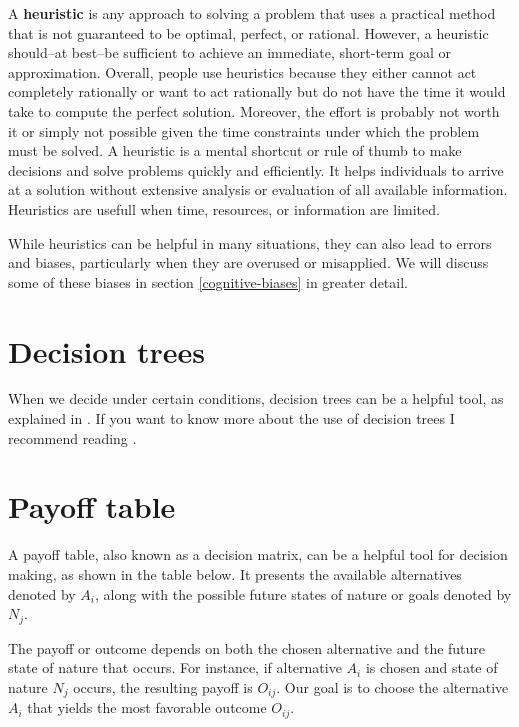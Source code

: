 \documentclass[
  12pt,
  oneside]{book}
\theoremstyle{definition}
\theoremstyle{definition}
\theoremstyle{definition}
\theoremstyle{definition}
\theoremstyle{remark}
\begin{document}
A \textbf{heuristic} is any approach to solving a problem that uses a practical method that is not guaranteed to be optimal, perfect, or rational. However, a heuristic should--at best--be sufficient to achieve an immediate, short-term goal or approximation. Overall, people use heuristics because they either cannot act completely rationally or want to act rationally but do not have the time it would take to compute the perfect solution. Moreover, the effort is probably not worth it or simply not possible given the time constraints under which the problem must be solved.
A heuristic is a mental shortcut or rule of thumb to make decisions and solve problems quickly and efficiently. It helps individuals to arrive at a solution without extensive analysis or evaluation of all available information. Heuristics are usefull when time, resources, or information are limited.

While heuristics can be helpful in many situations, they can also lead to errors and biases, particularly when they are overused or misapplied. We will discuss some of these biases in section \ref{cognitive-biases} in greater detail.

\section{Decision trees}\label{decision-trees}

When we decide under certain conditions, decision trees can be a helpful tool, as explained in \citep{Finne1998three}. If you want to know more about the use of decision trees I recommend reading \citet[ch.~4]{Bonanno2017Decision}.

\section{Payoff table}\label{payoff-table}

A payoff table, also known as a decision matrix, can be a helpful tool for decision making, as shown in the table below. It presents the available alternatives denoted by \(A_i\), along with the possible future states of nature or goals denoted by \(N_j\).

The payoff or outcome depends on both the chosen alternative and the future state of nature that occurs. For instance, if alternative \(A_i\) is chosen and state of nature \(N_j\) occurs, the resulting payoff is \(O_{ij}\). Our goal is to choose the alternative \(A_i\) that yields the most favorable outcome \(O_{ij}\).
\end{document}
